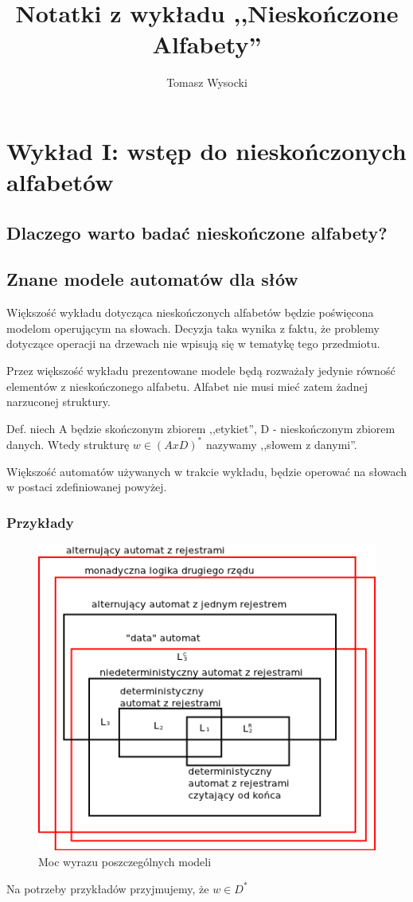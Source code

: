 \documentclass[a4paper,12pt]{report}
\title{Notatki z wykładu ,,Nieskończone Alfabety''}
\author{Tomasz Wysocki}
\begin{document}
\maketitle
\newpage
\tableofcontents
\newpage
\chapter {Wykład I: wstęp do nieskończonych alfabetów}
\section {Dlaczego warto badać nieskończone alfabety?}
\section {Znane modele automatów dla słów}

Większość wykładu dotycząca nieskończonych alfabetów będzie poświęcona modelom operującym na słowach. Decyzja taka wynika z faktu, że problemy dotyczące operacji na drzewach nie wpisują się w tematykę tego przedmiotu.

Przez większość wykładu prezentowane modele będą rozważały jedynie równość elementów z nieskończonego alfabetu. Alfabet nie musi mieć zatem żadnej narzuconej struktury.

Def. niech A będzie skończonym zbiorem ,,etykiet'', D - nieskończonym zbiorem danych. Wtedy strukturę $w \in (A x D)^*$ nazywamy ,,słowem z danymi''.

Większość automatów używanych w trakcie wykładu, będzie operować na słowach w postaci zdefiniowanej powyżej.

\subsection{Przykłady}
\begin{figure}
\begin{center}
\includegraphics{images/podzial_automatow.png}
\end{center}
\caption{Moc wyrazu poszczególnych modeli}
\end{figure}
Na potrzeby przykładów przyjmujemy, że $ w \in D^* $
\end{document}
